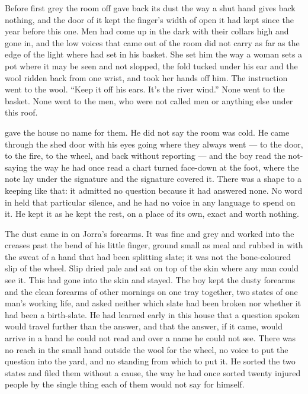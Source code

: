 
Before first grey the room off  gave back its dust the way a shut hand gives back nothing, and the door of it kept the finger's width of open it had kept since the year before this one. Men had come up  in the dark with their collars high and gone in, and the low voices that came out of the room did not carry as far as the edge of the light where  had set  in his basket. She set him the way a woman sets a pot where it may be seen and not slopped, the fold tucked under his ear and the wool ridden back from one wrist, and took her hands off him. The instruction went to the wool. “Keep it off his ears. It's the river wind.” None went to the basket. None went to the men, who were not called men or anything else under this roof.

 gave the house no name for them. He did not say the room was cold. He came through the shed door with his eyes going where they always went --- to the door, to the fire, to the wheel, and back without reporting --- and the boy read the not-saying the way he had once read a chart turned face-down at the foot, where the note lay under the signature and the signature covered it. There was a shape to a keeping like that: it admitted no question because it had answered none. No word in  held that particular silence, and he had no voice in any language to spend on it. He kept it as he kept the rest, on a place of its own, exact and worth nothing.

The dust came in on Jorra's forearms. It was fine and grey and worked into the creases past the bend of his little finger, ground small as meal and rubbed in with the sweat of a hand that had been splitting slate; it was not the bone-coloured slip of the wheel. Slip dried pale and sat on top of the skin where any man could see it. This had gone into the skin and stayed. The boy kept the dusty forearms and the clean forearms of other mornings on one tray together, two states of one man's working life, and asked neither which slate had been broken nor whether it had been a birth-slate. He had learned early in this house that a question spoken would travel further than the answer, and that the answer, if it came, would arrive in a hand he could not read and over a name he could not see. There was no reach in the small hand outside the wool for the wheel, no voice to put the question into the yard, and no standing from which to put it. He sorted the two states and filed them without a cause, the way he had once sorted twenty injured people by the single thing each of them would not say for himself.

